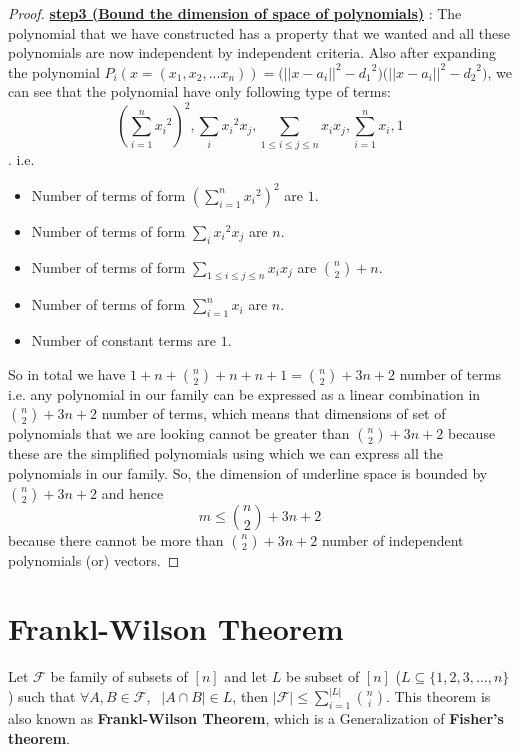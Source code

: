 \begin{proof}
\underline{\textbf{step3 (Bound the dimension of space of polynomials)}} :  
The polynomial that we have constructed has a property that we wanted and all these polynomials are now independent by independent criteria. Also after expanding the polynomial $P_i(x=(x_1,x_2,...x_n)) = \big({||x-a_i||}^2-{d_1}^2\big)\big({||x-a_i||}^2-{d_2}^2\big)$, we can see that the polynomial have only following type of terms:
$$(\sum_{i=1}^{n}{x_i}^{2})^2, {\sum_{i}{x_i}^{2}} x_j, {\sum_{1 \le i\le j \le n}x_ix_j}, \sum_{i=1}^{n}x_i ,1$$.
i.e. 
\begin{itemize}
    \item Number of terms of form $(\sum_{i=1}^{n}{x_i}^{2})^2$ are $1$. 
    \item Number of terms of form ${\sum_{i}{x_i}^{2}} x_j$ are $n$. 
    \item Number of terms of form ${\sum_{1 \le i\le j \le n}x_ix_j}$ are ${n \choose 2} + n$. 
    \item Number of terms of form $\sum_{i=1}^{n}x_i$ are $n$. 
    \item Number of constant terms are $1$. 
\end{itemize}
So in total we have $1+n+{n \choose 2} + n + n +1  = {n \choose 2} + 3n + 2$ number of terms i.e. any polynomial in our family can be expressed as a linear combination in ${n \choose 2} + 3n + 2$ number of terms, which means that dimensions of set of polynomials that we are looking cannot be greater than ${n \choose 2} + 3n + 2$ because these are the simplified polynomials using which we can express all the polynomials in our family. So, the dimension of underline space is bounded by ${n \choose 2} + 3n + 2$ and hence 
$$m \le {n \choose 2} + 3n + 2$$ because there cannot be more than ${n \choose 2} + 3n + 2$ number of independent polynomials (or) vectors.
\end{proof}

\section{Frankl-Wilson Theorem}
\begin{theorem}
Let $\mathcal{F}$ be family of subsets of $[n]$ and let $L$ be subset of $[n]$ ($L \subseteq \{1,2,3,...,n\}$) such that $\forall A,B \in \mathcal{F}$,  $~~|A\cap B| \in L$, then $|\mathcal{F}| \le \sum_{i=1}^{|L|} {n \choose i}$. This theorem is also known as \textbf{Frankl-Wilson Theorem}, which is a Generalization of \textbf{Fisher's theorem}.
\end{theorem}

